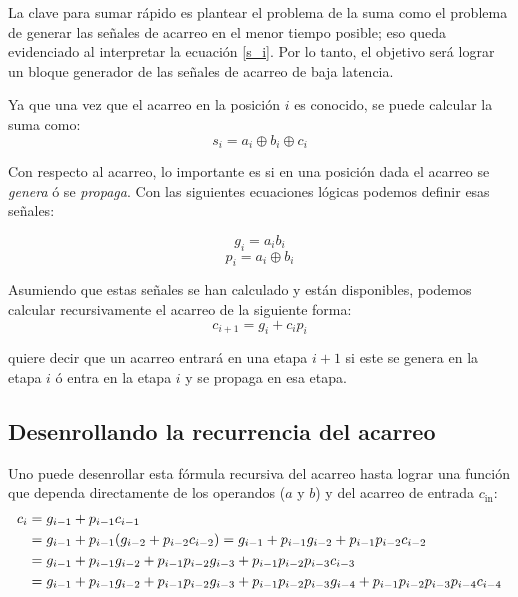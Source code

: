 La clave para sumar rápido es plantear el problema de la suma como el problema de generar las señales de acarreo en el menor tiempo posible; eso queda evidenciado al interpretar la ecuación \ref{s_i}. Por lo tanto, el objetivo será lograr un bloque generador de las señales de acarreo de baja latencia\cite{arithmeticComputer}.

Ya que una vez que el acarreo en la posición \(i\) es conocido, se puede calcular la suma como:
\begin{equation}
s_i = a_i \oplus b_i\oplus c_i\label{s_i}
\end{equation}

Con respecto al acarreo, lo importante es si en una posición dada el acarreo se \emph{genera} ó se \emph{propaga}. Con las siguientes ecuaciones lógicas podemos definir esas señales:
%

$$g_i=a_ib_i$$
$$p_i=a_i \oplus b_i$$


Asumiendo que estas señales se han calculado y están disponibles, podemos calcular recursivamente el acarreo de la siguiente forma:
\begin{equation}
c_{i+1}=g_i + c_i p_i
\end{equation}


\noindent quiere decir que un acarreo entrará en una etapa \(i+1\) si este se genera en la etapa \(i\) ó entra en la etapa \(i\) y se propaga en esa etapa.

\subsection{Desenrollando la recurrencia del acarreo}
Uno puede desenrollar esta fórmula recursiva del acarreo hasta lograr una función que dependa directamente de los operandos ($a$ y $b$) y del acarreo de entrada $c_{\text{in}}$:
\begin{equation}
\begin{align}
c_i &= g_{i-1} + p_{i-1}c_{i-1}\notag\\
&=g_{i-1}+p_{i-1}(g_{i-2}+p_{i-2}c_{i-2})=g_{i-1}+p_{i-1}g_{i-2}+p_{i-1}p_{i-2}c_{i-2}\notag\\
&=g_{i-1} + p_{i-1}g_{i-2}+p_{i-1}p_{i-2}g_{i-3}+p_{i-1}p_{i-2}p_{i-3}c_{i-3}\notag\\
&=g_{i-1} +p_{i-1}g_{i-2}+p_{i-1}p_{i-2}g_{i-3}+p_{i-1}p_{i-2}p_{i-3}g_{i-4}+p_{i-1}p_{i-2}p_{i-3}p_{i-4}c_{i-4}\label{gyp}	
\end{align}
\end{equation}

